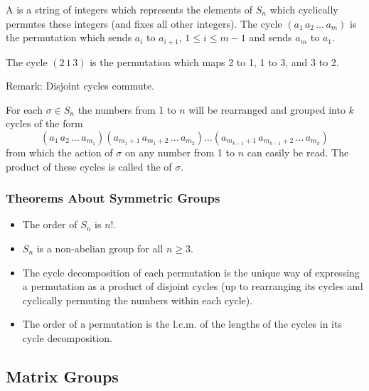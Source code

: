 \begin{definition}[Cycle]
	A  is a string of integers which represents the 
	elements of $S_n$ which cyclically permutes these integers (and 
	fixes all other integers). The cycle $(a_1 \, a_2 \, \dots \, 
	a_m)$ is the permutation which sends $a_i$ to $a_{i+1}$, $1 
	\leq i \leq m-1$ and sends $a_m$ to $a_1$.
\end{definition}

\begin{example}
	The cycle $(2 \, 1 \, 3)$ is the permutation which maps 2 to 1, 
	1 to 3, and 3 to 2.
\end{example}

Remark: Disjoint cycles commute.

For each $\sigma \in S_n$ the numbers from 1 to $n$ will 
be rearranged and grouped into $k$ cycles of the form
\[
(a_1 \, a_2 \, \dots \, a_{m_1})
(a_{m_1+1} \, a_{m_1+2} \, \dots \, a_{m_2})
\dots 
(a_{m_{k-1}+1} \, a_{m_{k-1}+2} \, \dots \, a_{m_k})
\]
from which the action of $\sigma$ on any number from 1 to $n$ 
can easily be read. The product of these cycles is called the 
 of $\sigma$.

\subsubsection{Theorems About Symmetric Groups}

\begin{itemize}
	\item The order of $S_n$ is $n!$.
	
	\item $S_n$ is a non-abelian group for all $n \geq 3$.
	
	\item The cycle decomposition of each permutation is the unique 
	way of expressing a permutation as a product of disjoint cycles 
	(up to rearranging its cycles and cyclically permuting the 
	numbers within each cycle).
	
	\item The order of a permutation is the l.c.m. of the lengths 
	of the cycles in its cycle decomposition.
\end{itemize}


\newpage

\subsection{Matrix Groups}

